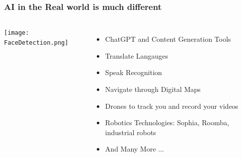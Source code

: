 \documentclass{beamer}
\begin{document}
\begin{frame}
  \frametitle{AI in the Real world is much different}
  \begin{columns}
    \texttt{[image: FaceDetection.png]}
    \begin{itemize}
      \item ChatGPT and Content Generation Tools
      \item Translate Langauges
      \item Speak Recognition
      \item Navigate through Digital Maps
      \item Drones to track you and record your videos
      \item Robotics Technologies: Sophia, Roomba, industrial robots
      \item And Many More ...
    \end{itemize}
  \end{columns}  

\end{frame}
\end{document}
